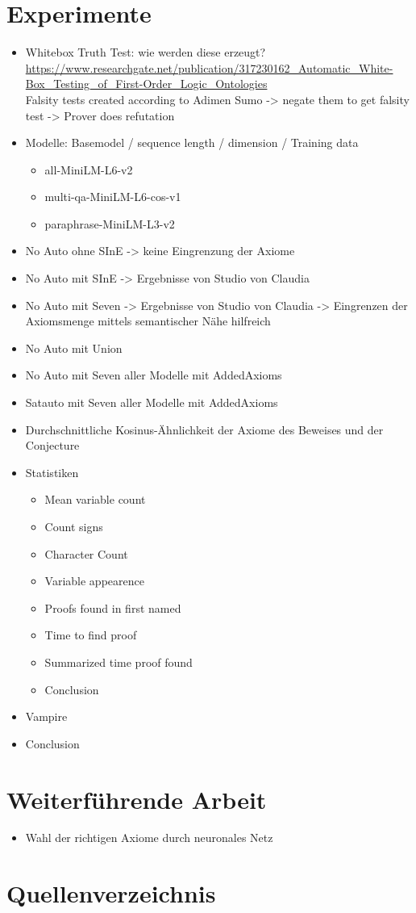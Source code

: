 \documentclass[german,version-2020-11]{uzl-thesis}
\begin{document}
\chapter{Experimente}
  \begin{itemize}
    \item Whitebox Truth Test: wie werden diese erzeugt? \url{https://www.researchgate.net/publication/317230162_Automatic_White-Box_Testing_of_First-Order_Logic_Ontologies}\\
    Falsity tests created according to Adimen Sumo -> negate them to get falsity test -> Prover does refutation
    \item Modelle: Basemodel / sequence length / dimension / Training data
    \begin{itemize}
      \item all-MiniLM-L6-v2
      \item multi-qa-MiniLM-L6-cos-v1
      \item paraphrase-MiniLM-L3-v2
    \end{itemize}
    \item No Auto ohne SInE -> keine Eingrenzung der Axiome
    \item No Auto mit SInE -> Ergebnisse von Studio von Claudia
    \item No Auto mit Seven -> Ergebnisse von Studio von Claudia
    -> Eingrenzen der Axiomsmenge mittels semantischer Nähe hilfreich
    \item No Auto mit Union
    \item No Auto mit Seven aller Modelle mit AddedAxioms
    \item Satauto mit Seven aller Modelle mit AddedAxioms
    \item Durchschnittliche Kosinus-Ähnlichkeit der Axiome des Beweises und der Conjecture
    \item Statistiken
      \begin{itemize}
        \item Mean variable count
        \item Count signs
        \item Character Count
        \item Variable appearence
        \item Proofs found in first named
        \item Time to find proof
        \item Summarized time proof found
        \item Conclusion
      \end{itemize}
    \item Vampire
    \item Conclusion
  \end{itemize}
\chapter{Weiterführende Arbeit}
\begin{itemize}
  \item Wahl der richtigen Axiome durch neuronales Netz
\end{itemize}
\chapter{Quellenverzeichnis}
\end{document}
